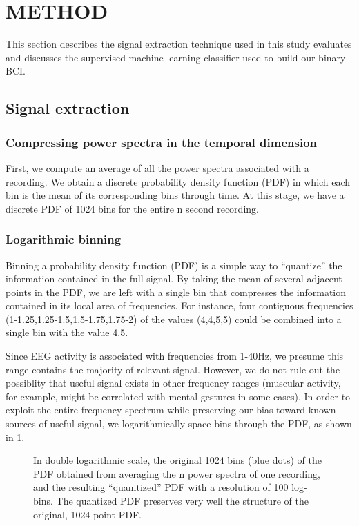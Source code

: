 \section{\uppercase{Method}}

This section describes the signal extraction technique used in this study evaluates and discusses the supervised machine learning classifier used to build our binary BCI.

\subsection{Signal extraction}

\subsubsection{Compressing power spectra in the temporal dimension}

First, we compute an average of all the power spectra associated with a recording. We obtain a discrete probability density function (PDF) in which each bin is the mean of its corresponding bins through time. At this stage, we have a discrete PDF of 1024 bins for the entire n second recording. 

\subsubsection{Logarithmic binning}

Binning a probability density function (PDF) is a simple way to ``quantize'' the information contained in the full signal. By taking the mean of several adjacent points in the PDF, we are left with a single bin that compresses the information contained in its local area of frequencies. For instance, four contiguous frequencies (1-1.25,1.25-1.5,1.5-1.75,1.75-2) of the values (4,4,5,5) could be combined into a single bin with the value 4.5. 

Since EEG activity is associated with frequencies from 1-40Hz, we presume this range contains the majority of relevant signal. However, we do not rule out the possiblity that useful signal exists in other frequency ranges (muscular activity, for example, might be correlated with mental gestures in some cases). In order to exploit the entire frequency spectrum while preserving our bias toward known sources of useful signal, we logarithmically space bins through the PDF, as shown in \ref{binnedEEGpowerspec}.

\begin{figure}[!h]
  \vspace{-0.2cm}
  {}
\caption{In double logarithmic scale, the original 1024 bins (blue dots) of the PDF obtained from averaging the n power spectra of one recording, and the resulting ``quanitized''  PDF with a resolution of 100 log-bins. The quantized PDF preserves very well the structure of the original, 1024-point PDF. }
\label{binnedEEGpowerspec}
\vspace{-0.1cm}
\end{figure}


